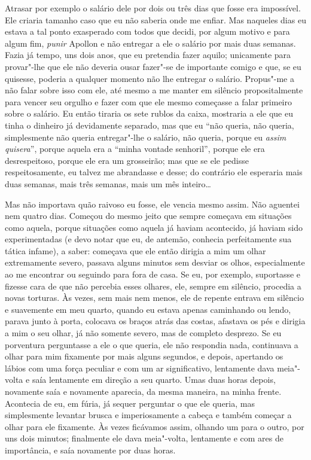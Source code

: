 Atrasar por exemplo o salário dele por dois ou três dias que fosse era
impossível. Ele criaria tamanho caso que eu não saberia onde me enfiar.
Mas naqueles dias eu estava a tal ponto exasperado com todos que
decidi, por algum motivo e para algum fim, \textit{punir} Apollon e não
entregar a ele o salário por mais duas semanas. Fazia já tempo, uns
dois anos, que eu pretendia fazer aquilo; unicamente para provar"-lhe
que ele não deveria ousar fazer"-se de importante comigo e que, se eu
quisesse, poderia a qualquer momento não lhe entregar o salário.
Propus"-me a não falar sobre isso com ele, até mesmo a me manter em
silêncio propositalmente para vencer seu orgulho e fazer com que ele
mesmo começasse a falar primeiro sobre o salário. Eu então tiraria os
sete rublos da caixa, mostraria a ele que eu tinha o dinheiro já
devidamente separado, mas que eu “não queria, não queria, simplesmente
não queria entregar"-lhe o salário, não queria, porque eu
\textit{assim quisera}”, porque aquela era a “minha
vontade senhoril”, porque ele era desrespeitoso, porque ele era um
grosseirão; mas que se ele pedisse respeitosamente, eu talvez me
abrandasse e desse; do contrário ele esperaria mais duas semanas, mais
três semanas, mais um mês inteiro\ldots{}

Mas não importava quão raivoso eu fosse, ele vencia mesmo assim. Não
aguentei nem quatro dias. Começou do mesmo jeito que sempre começava em
situações como aquela, porque situações como aquela já haviam
acontecido, já haviam sido experimentadas (e devo notar que eu, de
antemão, conhecia perfeitamente sua tática infame), a saber: começava
que ele então dirigia a mim um olhar extremamente severo, passava
alguns minutos sem desviar os olhos, especialmente ao me encontrar ou
seguindo para fora de casa. Se eu, por exemplo, suportasse e fizesse
cara de que não percebia esses olhares, ele, sempre em silêncio,
procedia a novas torturas. Às vezes, sem mais nem menos, ele de repente
entrava em silêncio e suavemente em meu quarto, quando eu estava apenas
caminhando ou lendo, parava junto à porta, colocava os braços atrás das
costas, afastava os pés e dirigia a mim o seu olhar, já não somente
severo, mas de completo desprezo. Se eu porventura perguntasse a ele o
que queria, ele não respondia nada, continuava a olhar para mim
fixamente por mais alguns segundos, e depois, apertando os lábios com
uma força peculiar e com um ar significativo, lentamente dava
meia"-volta e saía lentamente em direção a seu quarto. Umas duas horas
depois, novamente saía e novamente aparecia, da mesma maneira, na minha
frente. Acontecia de eu, em fúria, já sequer perguntar o que ele
queria, mas simplesmente levantar brusca e imperiosamente a cabeça e
também começar a olhar para ele fixamente. Às vezes ficávamos assim,
olhando um para o outro, por uns dois minutos; finalmente ele dava
meia"-volta, lentamente e com ares de importância, e saía novamente por
duas horas.

